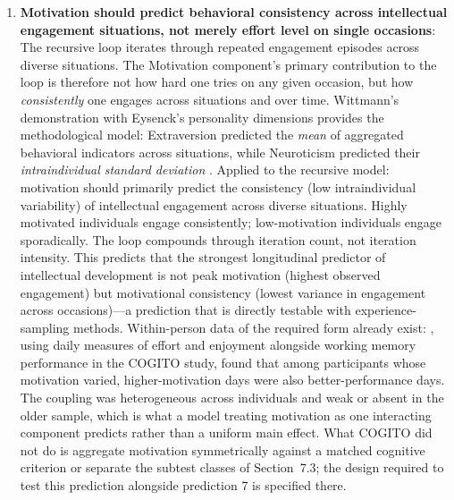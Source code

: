 \documentclass[12pt,a4paper]{article}
\begin{document}
\begin{enumerate}
\item \textbf{Motivation should predict behavioral consistency across intellectual engagement situations, not merely effort level on single occasions}: The recursive loop iterates through repeated engagement episodes across diverse situations. The Motivation component's primary contribution to the loop is therefore not how hard one tries on any given occasion, but how \emph{consistently} one engages across situations and over time. Wittmann's demonstration with Eysenck's personality dimensions provides the methodological model: Extraversion predicted the \emph{mean} of aggregated behavioral indicators across situations, while Neuroticism predicted their \emph{intraindividual standard deviation} \citep{Wittmann1988}. Applied to the recursive model: motivation should primarily predict the consistency (low intraindividual variability) of intellectual engagement across diverse situations. Highly motivated individuals engage consistently; low-motivation individuals engage sporadically. The loop compounds through iteration count, not iteration intensity. This predicts that the strongest longitudinal predictor of intellectual development is not peak motivation (highest observed engagement) but motivational consistency (lowest variance in engagement across occasions)---\hspace{0pt}a prediction that is directly testable with experience-sampling methods. Within-person data of the required form already exist: \citet{Brose2010}, using daily measures of effort and enjoyment alongside working memory performance in the COGITO study, found that among participants whose motivation varied, higher-motivation days were also better-performance days. The coupling was heterogeneous across individuals and weak or absent in the older sample, which is what a model treating motivation as one interacting component predicts rather than a uniform main effect. What COGITO did not do is aggregate motivation symmetrically against a matched cognitive criterion or separate the subtest classes of Section~7.3; the design required to test this prediction alongside prediction 7 is specified there.


\end{enumerate}
\end{document}
